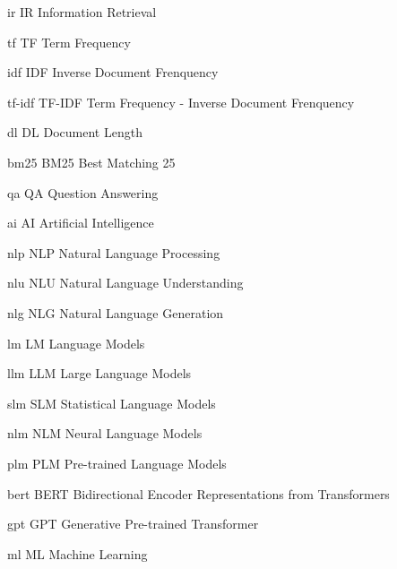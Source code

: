 

\newabbreviation
    {ir}
    {IR}
    {Information Retrieval}
\newcommand{\ir}{\gls{ir}}

\newabbreviation
    {tf}
    {TF}
    {Term Frequency}
\newcommand{\tf}{\gls{tf}}

\newabbreviation
    {idf}
    {IDF}
    {Inverse Document Frenquency}
\newcommand{\idf}{\gls{idf}}

\newabbreviation
    {tf-idf}
    {TF-IDF}
    {Term Frequency - Inverse Document Frenquency}
\newcommand{\tfidf}{\gls{tfidf}}

\newabbreviation
    {dl}
    {DL}
    {Document Length}
\newcommand{\dl}{\gls{dl}}


\newabbreviation
    {bm25}
    {BM25}
    {Best Matching 25}
\newcommand{\bm}{\gls{bm}}

\newabbreviation
    {qa}
    {QA}
    {Question Answering}
\newcommand{\qa}{\gls{qa}}

\newabbreviation
    {ai}
    {AI}
    {Artificial Intelligence}
\newcommand{\ai}{\gls{ai}}

\newabbreviation
    {nlp}
    {NLP}
    {Natural Language Processing}
\newcommand{\nlp}{\gls{nlp}}

\newabbreviation
    {nlu}
    {NLU}
    {Natural Language Understanding}
\newcommand{\nlu}{\gls{nlu}}

\newabbreviation
    {nlg}
    {NLG}
    {Natural Language Generation}
\newcommand{\nlg}{\gls{nlg}}

\newabbreviation
    {lm}
    {LM}
    {Language Models}
\newcommand{\lm}{\gls{lm}}

\newabbreviation
    {llm}
    {LLM}
    {Large Language Models}
\newcommand{\llm}{\gls{llm}}

\newabbreviation
    {slm}
    {SLM}
    {Statistical Language Models}
\newcommand{\slm}{\gls{slm}}

\newabbreviation
    {nlm}
    {NLM}
    {Neural Language Models}
\newcommand{\nlm}{\gls{nlm}}

\newabbreviation
    {plm}
    {PLM}
    {Pre-trained Language Models}
\newcommand{\plm}{\gls{plm}}

\newabbreviation
    {bert}
    {BERT}
    {Bidirectional Encoder Representations from Transformers}
\newcommand{\bert}{\gls{bert}}

\newabbreviation
    {gpt}
    {GPT}
    {Generative Pre-trained Transformer}
\newcommand{\gpt}{\gls{gpt}}

\newabbreviation
    {ml}
    {ML}
    {Machine Learning}
\newcommand{\mlearning}{\gls{mlearning}}